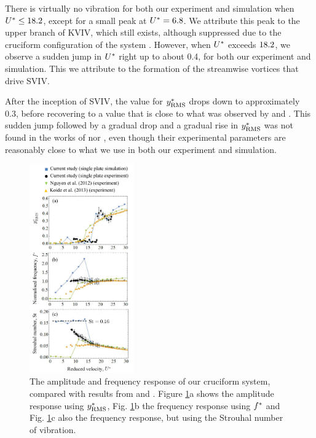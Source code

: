 \documentclass[a4paper,fleqn]{cas-sc}
\begin{document}
There is virtually no vibration for both our experiment and simulation when  $U^{*} \leq 18.2$, except for a small peak at $U^{*} = 6.8$. We attribute this peak to the upper branch of KVIV, which still exists, although suppressed due to the cruciform configuration of the system \citep{Shirakashi1989,Nguyen2012}. However, when  $U^{*}$ exceeds $18.2$, we observe a sudden jump in  $U^{*}$ right up to about 0.4, for both our experiment and simulation. This we attribute to the formation of the streamwise vortices that drive SVIV.

After the inception of SVIV, the value for  $y^{*}_{\text{RMS}}$ drops down to approximately 0.3, before recovering to a value that is close to what was observed by \citet{Nguyen2012} and \citet{Koide2013}. This sudden jump followed by a gradual drop and a gradual rise in  $y^{*}_{\text{RMS}}$ was not found in the works of \citet{Nguyen2012} nor \citet{Koide2013}, even though their experimental parameters are reasonably close to what we use in both our experiment and simulation.


\begin{figure}
  \centering
  \includegraphics[width=0.4\textwidth]{figs/figure10}
  \caption{The amplitude and frequency response of our cruciform system, compared with results from \citet{Nguyen2012} and \citet{Koide2013}. Figure \ref{fig:ampFreqComp}a shows the amplitude response using $y^{*}_{\text{RMS}}$, Fig. \ref{fig:ampFreqComp}b the frequency response using $f^{*}$ and Fig. \ref{fig:ampFreqComp}c also the frequency response, but using the Strouhal number of vibration.} \label{fig:ampFreqComp}
\end{figure}
\end{document}
